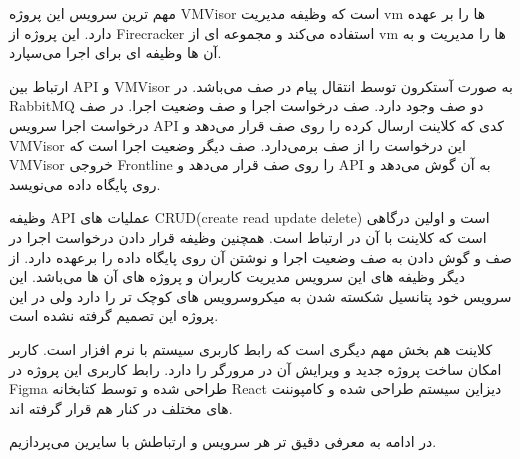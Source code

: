 مهم ترین سرویس این پروژه VMVisor است که وظیفه مدیریت vm ها را بر عهده دارد.
این پروژه از Firecracker استفاده می‌کند و مجموعه ای از vm ها را مدیریت و به آن ها وظیفه ای برای اجرا می‌سپارد.


ارتباط بین API و VMVisor به صورت آستکرون توسط انتقال پیام در صف می‌باشد.
در RabbitMQ دو صف وجود دارد. صف درخواست اجرا و صف وضعیت اجرا.
در صف درخواست اجرا سرویس API کدی که کلاینت ارسال کرده را روی صف قرار می‌دهد
و VMVisor این درخواست را از صف بر‌می‌دارد.
صف دیگر وضعیت اجرا است که VMVisor خروجی Frontline را روی صف قرار می‌دهد و API به آن گوش می‌دهد و روی پایگاه داده می‌نویسد.

وظیفه API عملیات های CRUD(create read update delete) است و اولین درگاهی است که کلاینت با آن در ارتباط است.
همچنین وظیفه قرار دادن درخواست اجرا در صف و گوش دادن به صف وضعیت اجرا و نوشتن آن روی پایگاه داده را برعهده دارد.
از دیگر وظیفه های این سرویس مدیریت کاربران و پروژه های آن ها می‌باشد.
این سرویس خود پتانسیل شکسته شدن به میکروسرویس های کوچک تر را دارد ولی در این پروژه این تصمیم گرفته نشده است.

کلاینت هم بخش مهم دیگری است که رابط کاربری سیستم با نرم افزار است. کاربر امکان ساخت پروژه جدید و ویرایش آن در مرورگر را دارد.
رابط کاربری این پروژه در Figma طراحی شده و توسط کتابخانه React دیزاین سیستم طراحی شده و کامپوننت های مختلف در کنار هم قرار گرفته اند.

در ادامه به معرفی دقیق تر هر سرویس و ارتباطش با سایرین می‌پردازیم.